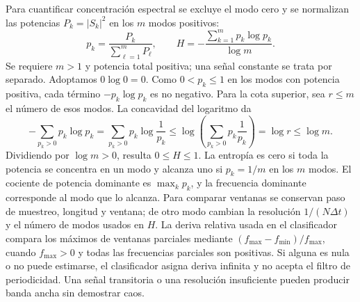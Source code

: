 Para cuantificar concentración espectral se excluye el modo cero y se
normalizan las potencias $P_k=|S_k|^2$ en los $m$ modos positivos:
\begin{equation}
 p_k=\frac{P_k}{\sum_{\ell=1}^mP_\ell},\qquad
 H=-\frac{\sum_{k=1}^mp_k\log p_k}{\log m}.
 \label{diag:master:entropy}
\end{equation}
Se requiere $m>1$ y potencia total positiva; una señal constante se trata
por separado. Adoptamos \(0\log0=0\). Como \(0<p_k\leq1\) en los modos
con potencia positiva, cada término \(-p_k\log p_k\) es no negativo.
Para la cota superior, sea \(r\leq m\) el número de esos modos. La
concavidad del logaritmo da
\[
 -\sum_{p_k>0}p_k\log p_k
 =\sum_{p_k>0}p_k\log\frac1{p_k}
 \leq\log\!\left(\sum_{p_k>0}p_k\frac1{p_k}\right)
 =\log r\leq\log m.
\]
Dividiendo por \(\log m>0\), resulta \(0\leq H\leq1\). La entropía
es cero si toda la potencia se concentra en un modo y alcanza uno si
\(p_k=1/m\) en los \(m\) modos.
El cociente de potencia dominante es $\max_kp_k$, y la frecuencia
dominante corresponde al modo que lo alcanza. Para comparar ventanas se
conservan paso de muestreo, longitud y ventana; de otro modo cambian la
resolución $1/(N\Delta t)$ y el número de modos usados en $H$.
La deriva relativa usada en el clasificador compara los máximos de
ventanas parciales mediante $(f_{\max}-f_{\min})/f_{\max}$, cuando
$f_{\max}>0$ y todas las frecuencias parciales son positivas. Si alguna
es nula o no puede estimarse, el clasificador asigna deriva infinita y
no acepta el filtro de periodicidad. Una señal transitoria o una resolución insuficiente pueden
producir banda ancha sin demostrar caos.

